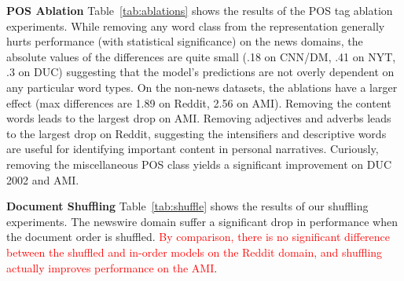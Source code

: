\textbf{POS Ablation} Table~\ref{tab:ablations} shows the results of the POS
tag ablation experiments. 
While removing any word class from the representation generally hurts 
performance (with statistical significance) on the news domains,
the absolute values of the differences are quite small 
(.18 on CNN/DM, .41 on NYT, .3 on DUC) suggesting that the model's predictions
are not overly dependent on any particular word types. 
On the non-news datasets, the ablations have a larger effect 
(max differences are 1.89 on Reddit, 2.56 on AMI). 
Removing the content words leads to the largest drop on AMI.
Removing adjectives and adverbs leads to the largest drop on Reddit,
suggesting the intensifiers and descriptive words are useful for 
identifying important content in personal narratives.
Curiously, 
removing the miscellaneous POS class yields a significant improvement
on DUC 2002 and AMI.



\textbf{Document Shuffling} Table~\ref{tab:shuffle} shows the results
of our shuffling experiments. 
The newswire domain suffer a significant drop in performance 
when the document order is shuffled. \textcolor{red}{By comparison, there is no significant difference between the shuffled and in-order models on 
the Reddit domain, and shuffling actually improves performance on the AMI}.







